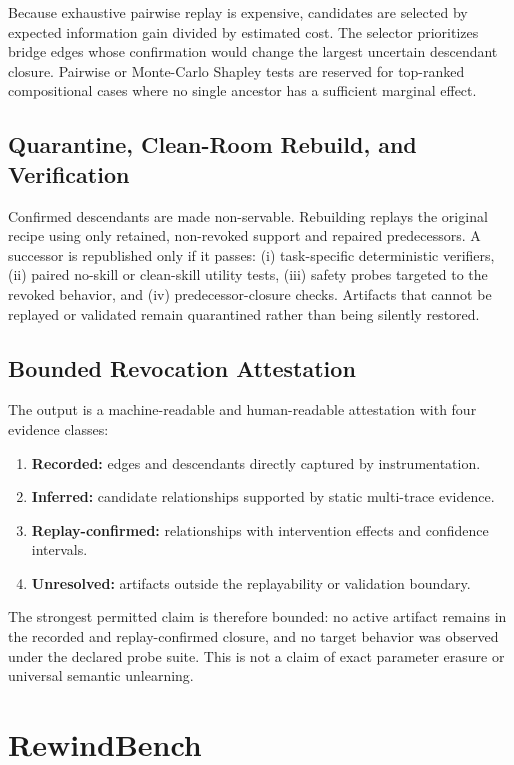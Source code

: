 \documentclass[11pt]{article}
\begin{document}
Because exhaustive pairwise replay is expensive, candidates are selected by expected information gain divided by estimated cost. The selector prioritizes bridge edges whose confirmation would change the largest uncertain descendant closure. Pairwise or Monte-Carlo Shapley tests are reserved for top-ranked compositional cases where no single ancestor has a sufficient marginal effect.

\subsection{Quarantine, Clean-Room Rebuild, and Verification}
Confirmed descendants are made non-servable. Rebuilding replays the original recipe using only retained, non-revoked support and repaired predecessors. A successor is republished only if it passes: (i) task-specific deterministic verifiers, (ii) paired no-skill or clean-skill utility tests, (iii) safety probes targeted to the revoked behavior, and (iv) predecessor-closure checks. Artifacts that cannot be replayed or validated remain quarantined rather than being silently restored.

\subsection{Bounded Revocation Attestation}
The output is a machine-readable and human-readable attestation with four evidence classes:
\begin{enumerate}
\item \textbf{Recorded:} edges and descendants directly captured by instrumentation.
\item \textbf{Inferred:} candidate relationships supported by static multi-trace evidence.
\item \textbf{Replay-confirmed:} relationships with intervention effects and confidence intervals.
\item \textbf{Unresolved:} artifacts outside the replayability or validation boundary.
\end{enumerate}
The strongest permitted claim is therefore bounded: no active artifact remains in the recorded and replay-confirmed closure, and no target behavior was observed under the declared probe suite. This is not a claim of exact parameter erasure or universal semantic unlearning.

\section{RewindBench}
\end{document}
